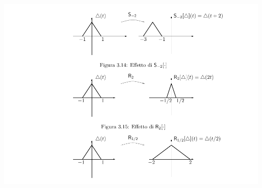 \documentclass[a4paper, 10pt]{report}
\begin{document}
\begin{center}
\includegraphics[scale=1]{part4.pdf}

\end{center}
\end{document}
